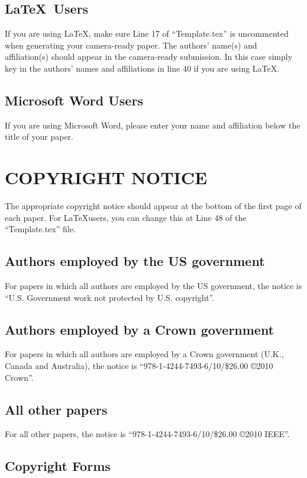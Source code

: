 \documentclass{article}
\begin{document}
\subsection{\LaTeX~Users}
If you are using \LaTeX, make sure Line 17 of ``Template.tex'' is
uncommented when generating your camera-ready paper. The authors'
name(s) and affiliation(s) should appear in the camera-ready
submission. In this case simply key in the authors' names and
affiliations in line 40 if you are using \LaTeX.

\subsection{Microsoft Word Users}
If you are using Microsoft Word, please enter your name and
affiliation below the title of your paper.

\section{COPYRIGHT NOTICE}
The appropriate copyright notice should appear at the bottom of the
first page of each paper. For \LaTeX users, you can change this at
Line 48 of the ``Template.tex'' file.

\subsection{Authors employed by the US government}
For papers in which all authors are employed by the US government,
the notice is ``U.S. Government work not protected by U.S.
copyright''.

\subsection{Authors employed by a Crown government}
For papers in which all authors are employed by a Crown government
(U.K., Canada and Australia), the notice is
``978-1-4244-7493-6/10/\$26.00 \copyright2010 Crown''.


\subsection{All other papers}
For all other papers, the notice is ``978-1-4244-7493-6/10/\$26.00
\copyright2010 IEEE''.

\subsection{Copyright Forms} \label{sec:copyright}
\end{document}
